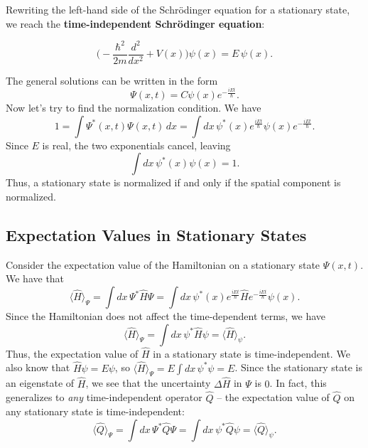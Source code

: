 Rewriting the left-hand side of the Schrödinger equation for a stationary state, we reach the \textbf{time-independent Schrödinger equation}:

\begin{framedthm}\label{time-independent-schrodinger}
    $$\bigg(-\frac{\hbar^2}{2m}\frac{d^2}{dx^2}+V(x)\bigg)\psi(x)=E\,\psi(x).$$
\end{framedthm}

The general solutions can be written in the form $$\Psi(x,t)=C\psi(x)e^{-\frac{iEt}{\hbar}}.$$Now let's try to find the normalization condition. We have $$1=\int\Psi^*(x,t)\Psi(x,t)\,dx=\int dx\,\psi^*(x)e^{\frac{iEt}{\hbar}}\psi(x)e^{-\frac{iEt}{\hbar}}.$$Since $E$ is real, the two exponentials cancel, leaving $$\int dx\,\psi^*(x)\psi(x)=1.$$Thus, a stationary state is normalized if and only if the spatial component is normalized.

\subsection{Expectation Values in Stationary States}\label{expectation_stationary}

Consider the expectation value of the Hamiltonian on a stationary state $\Psi(x,t)$. We have that $$\langle\hat{H}\rangle_\Psi=\int dx\,\Psi^*\hat{H}\Psi=\int dx\,\psi^*(x)e^{\frac{iEt}{\hbar}}\hat{H}e^{-\frac{iEt}{\hbar}}\psi(x).$$Since the Hamiltonian does not affect the time-dependent terms, we have $$\langle\hat{H}\rangle_\Psi=\int dx\,\psi^*\hat{H}\psi=\langle\hat{H}\rangle_\psi.$$Thus, the expectation value of $\hat{H}$ in a stationary state is time-independent. We also know that $\hat{H}\psi=E\psi$, so $\langle\hat{H}\rangle_\Psi=E\int dx\,\psi^*\psi=E$. Since the stationary state is an eigenstate of $\hat{H}$, we see that the uncertainty $\Delta\hat{H}$ in $\Psi$ is $0$. In fact, this generalizes to \textit{any} time-independent operator $\hat{Q}$ -- the expectation value of $\hat{Q}$ on any stationary state is time-independent: $$\langle\hat{Q}\rangle_\Psi=\int dx\,\Psi^*\hat{Q}\Psi=\int dx\,\psi^*\hat{Q}\psi=\langle\hat{Q}\rangle_\psi.$$

